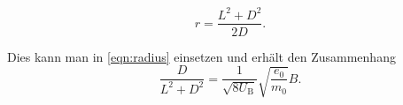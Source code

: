 \begin{equation}
    r = \frac{L^2 + D^2}{2D}.
    \label{eqn:radius2}
\end{equation}

Dies kann man in \ref{eqn:radius} einsetzen und erhält den Zusammenhang 
\begin{equation}
    \frac{D}{L^2 + D^2}= \frac{1}{\sqrt{8 U_\text{B}}}\sqrt{\frac{e_\text{0}}{m_\text{0}}} B.
    \label{eqn:Ende}
\end{equation}
